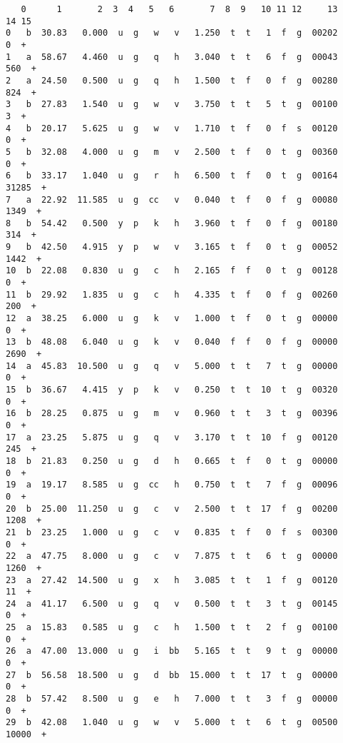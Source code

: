 \documentclass[11pt]{article}
\begin{document}
    \begin{verbatim}
   0      1       2  3  4   5   6       7  8  9   10 11 12     13     14 15
0   b  30.83   0.000  u  g   w   v   1.250  t  t   1  f  g  00202      0  +
1   a  58.67   4.460  u  g   q   h   3.040  t  t   6  f  g  00043    560  +
2   a  24.50   0.500  u  g   q   h   1.500  t  f   0  f  g  00280    824  +
3   b  27.83   1.540  u  g   w   v   3.750  t  t   5  t  g  00100      3  +
4   b  20.17   5.625  u  g   w   v   1.710  t  f   0  f  s  00120      0  +
5   b  32.08   4.000  u  g   m   v   2.500  t  f   0  t  g  00360      0  +
6   b  33.17   1.040  u  g   r   h   6.500  t  f   0  t  g  00164  31285  +
7   a  22.92  11.585  u  g  cc   v   0.040  t  f   0  f  g  00080   1349  +
8   b  54.42   0.500  y  p   k   h   3.960  t  f   0  f  g  00180    314  +
9   b  42.50   4.915  y  p   w   v   3.165  t  f   0  t  g  00052   1442  +
10  b  22.08   0.830  u  g   c   h   2.165  f  f   0  t  g  00128      0  +
11  b  29.92   1.835  u  g   c   h   4.335  t  f   0  f  g  00260    200  +
12  a  38.25   6.000  u  g   k   v   1.000  t  f   0  t  g  00000      0  +
13  b  48.08   6.040  u  g   k   v   0.040  f  f   0  f  g  00000   2690  +
14  a  45.83  10.500  u  g   q   v   5.000  t  t   7  t  g  00000      0  +
15  b  36.67   4.415  y  p   k   v   0.250  t  t  10  t  g  00320      0  +
16  b  28.25   0.875  u  g   m   v   0.960  t  t   3  t  g  00396      0  +
17  a  23.25   5.875  u  g   q   v   3.170  t  t  10  f  g  00120    245  +
18  b  21.83   0.250  u  g   d   h   0.665  t  f   0  t  g  00000      0  +
19  a  19.17   8.585  u  g  cc   h   0.750  t  t   7  f  g  00096      0  +
20  b  25.00  11.250  u  g   c   v   2.500  t  t  17  f  g  00200   1208  +
21  b  23.25   1.000  u  g   c   v   0.835  t  f   0  f  s  00300      0  +
22  a  47.75   8.000  u  g   c   v   7.875  t  t   6  t  g  00000   1260  +
23  a  27.42  14.500  u  g   x   h   3.085  t  t   1  f  g  00120     11  +
24  a  41.17   6.500  u  g   q   v   0.500  t  t   3  t  g  00145      0  +
25  a  15.83   0.585  u  g   c   h   1.500  t  t   2  f  g  00100      0  +
26  a  47.00  13.000  u  g   i  bb   5.165  t  t   9  t  g  00000      0  +
27  b  56.58  18.500  u  g   d  bb  15.000  t  t  17  t  g  00000      0  +
28  b  57.42   8.500  u  g   e   h   7.000  t  t   3  f  g  00000      0  +
29  b  42.08   1.040  u  g   w   v   5.000  t  t   6  t  g  00500  10000  +
    \end{verbatim}

    
    
\end{document}
